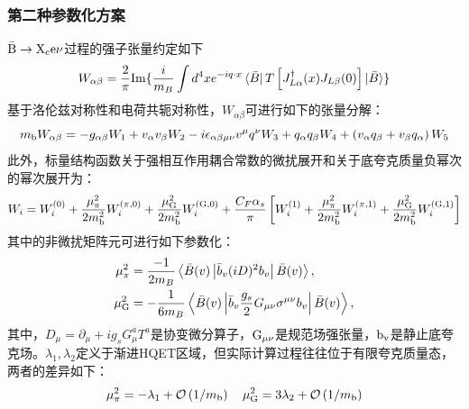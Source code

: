 \subsubsection{第二种参数化方案}
$\mathrm{\bar{B}}\to\mathrm{X_c e\nu}$过程的强子张量约定如下
\begin{equation}
    W_{\alpha \beta}=\frac{2}{\pi}\text{Im}\{\frac{i}{m_{B}} \int d^4 x e^{-i q \cdot x} \bra{\bar{B}}T\left[J_{L \alpha}^{\dagger}(x) J_{L \beta}(0)\right] \ket{\bar{B}}\}
    \end{equation}
基于洛伦兹对称性和电荷共轭对称性，$W_{\alpha\beta}$可进行如下的张量分解：
    \begin{equation}
         m_{\mathrm{b}}W_{\alpha \beta}=-g_{\alpha \beta}W_1+v_\alpha v_\beta W_2-i \epsilon_{\alpha \beta \mu \nu} v^\mu q^\nu  W_3+q_\alpha q_\beta W_4+\left(v_\alpha q_\beta+v_\beta q_\alpha\right) W_5
    \end{equation}
    此外，标量结构函数关于强相互作用耦合常数的微扰展开和关于底夸克质量负幂次的幂次展开为：
    \begin{equation}
        W_i = W_i^{(0)} + \frac{\mathrm{\mu_{\pi}^2}}{2 m_{\mathrm{b}}^2} W_i^{(\pi, 0)} + \frac{\mathrm{\mu_{\mathrm{G}}^2}}{2 m_{\mathrm{b}}^2} W_i^{(\mathrm{G}, 0)} + \frac{C_F \alpha_s}{\pi} \left[ W_i^{(1)} + \frac{\mathrm{\mu_{\pi}^2}}{2 m_{\mathrm{b}}^2} W_i^{(\pi, 1)} + \frac{\mathrm{\mu_{\mathrm{G}}^2}}{2 m_{\mathrm{b}}^2} W_i^{(\mathrm{G}, 1)} \right]
        \end{equation}        
    其中的非微扰矩阵元可进行如下参数化：
    \begin{equation}
        \begin{aligned}
            \mathrm{\mu_\pi^2}&=\frac{-1}{2 m_B}\left\langle\bar{B}(v)\left|\bar{b}_v(i D)^2 b_v\right| \bar{B}(v)\right\rangle,\\
            \mathrm{\mu_G^2}&=-\frac{1}{6 m_B}\left\langle\bar{B}(v)\left|\bar{b}_v \frac{g_s}{2} G_{\mu \nu} \sigma^{\mu \nu} b_v\right| \bar{B}(v)\right\rangle,
        \end{aligned}
    \end{equation}
    其中，$D_\mu=\partial_\mu+i g_s G_\mu^a T^a$是协变微分算子，$\mathrm{G_{\mu\nu}}$是规范场强张量，$\mathrm{b_{v}}$是静止底夸克场。$\lambda_1, \lambda_2$定义于渐进HQET区域，但实际计算过程往往位于有限夸克质量态，两者的差异如下：
    $$\mathrm{\mu_\pi^2=-\lambda_1}+\mathcal{O} \left(1 / m_{\mathrm{b}}\right)\quad \mathrm{\mu_G^2=3 \lambda_2}+\mathcal{O}\left(1 / m_{\mathrm{b}}\right)$$
   
